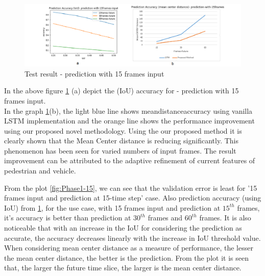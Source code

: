 \begin{figure}[H] 
\includegraphics[scale=0.6]{Phase1-accuracy}
\begin{center}
\caption{Test result - prediction with 15 frames input}
\label{Phase1-accuracy}
\end{center}
\end{figure}

In the above figure \ref{Phase1-accuracy} (a) depict the (IoU) accuracy for - prediction with 15 frames input. \\
In the graph \ref{Phase1-accuracy}(b), the light blue line shows mean\textunderscore distance\textunderscore accuracy using vanilla LSTM implementation and the orange line shows the performance improvement using our proposed novel methodology. Using the our proposed method it is clearly shown that the Mean Center distance is reducing significantly. This phenomenon has been seen for varied numbers of input frames. The result improvement can be attributed to the adaptive refinement of current features of pedestrian and vehicle.



From the plot \ref{fig:Phase1-15}, we can see that the validation error is least for '15 frames input and prediction at 15-time step' case. Also prediction accuracy (using IoU) from \ref{Phase1-accuracy}, for the use case, with 15 frames input and prediction at $15^{th}$ frames, it's accuracy is better than prediction at $30^{th}$ frames and $60^{th}$ frames. It is also noticeable that with an increase in the IoU for considering the prediction as accurate, the accuracy decreases linearly with the increase in IoU threshold value. When considering mean center distance as a measure of performance, the lesser the mean center distance, the better is the prediction. From the plot it is seen that, the larger the future time slice, the larger is the mean center distance.

